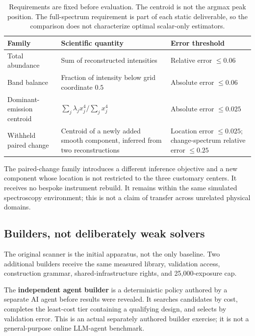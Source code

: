 \documentclass[11pt,a4paper]{article}
\begin{document}
\begin{table}[htbp]
\centering
\small
\begin{tabularx}{\textwidth}{@{}p{}Xp{}@{}}
\toprule
Family & Scientific quantity & Error threshold\\
\midrule
Total abundance & Sum of reconstructed intensities & Relative error \(\leq0.06\)\\
Band balance & Fraction of intensity below grid coordinate \(0.5\) & Absolute error \(\leq0.06\)\\
Dominant-emission centroid & \(\sum_j\lambda_j x_j^4/\sum_jx_j^4\) & Absolute error \(\leq0.025\)\\
Withheld paired change & Centroid of a newly added smooth component, inferred from two reconstructions & Location error \(\leq0.025\); change-spectrum relative error \(\leq0.25\)\\
\bottomrule
\end{tabularx}
\caption{Requirements are fixed before evaluation. The centroid is not the argmax peak position. The full-spectrum requirement is part of each static deliverable, so the comparison does not characterize optimal scalar-only estimators.}
\end{table}

The paired-change family introduces a different inference objective and a new component whose location is not restricted to the three customary centers. It receives no bespoke instrument rebuild. It remains within the same simulated spectroscopy environment; this is not a claim of transfer across unrelated physical domains.

\subsection{Builders, not deliberately weak solvers}

The original scanner is the initial apparatus, not the only baseline. Two additional builders receive the same measured library, validation access, construction grammar, shared-infrastructure rights, and 25,000-exposure cap.

The \textbf{independent agent builder} is a deterministic policy authored by a separate AI agent before results were revealed. It searches candidates by cost, completes the least-cost tier containing a qualifying design, and selects by validation error. This is an actual separately authored builder exercise; it is not a general-purpose online LLM-agent benchmark.
\end{document}
